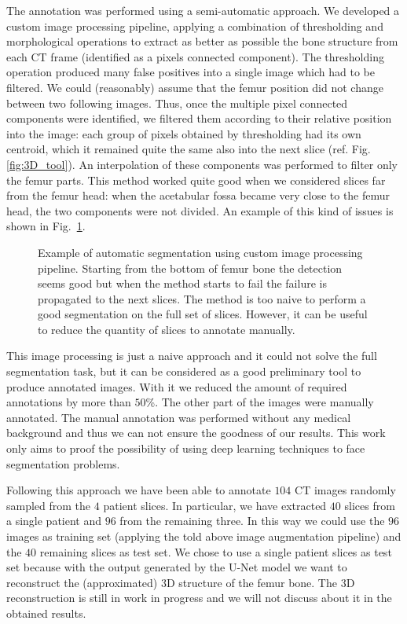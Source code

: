 \documentclass{standalone}
\begin{document}
The annotation was performed using a semi-automatic approach.
We developed a custom image processing pipeline, applying a combination of thresholding and morphological operations to extract as better as possible the bone structure from each CT frame (identified as a pixels connected component).
The thresholding operation produced many false positives into a single image which had to be filtered.
We could (reasonably) assume that the femur position did not change between two following images.
Thus, once the multiple pixel connected components were identified, we filtered them according to their relative position into the image: each group of pixels obtained by thresholding had its own centroid, which it remained quite the same also into the next slice (ref. Fig.\ref{fig:3D_tool}).
An interpolation of these components was performed to filter only the femur parts.
This method worked quite good when we considered slices far from the femur head: when the acetabular fossa became very close to the femur head, the two components were not divided.
An example of this kind of issues is shown in Fig.~\ref{fig:seg_tool}.

\begin{figure}[htbp]
\centering
\def\svgwidth{0.85\textwidth}

\caption{Example of automatic segmentation using custom image processing pipeline.
Starting from the bottom of femur bone the detection seems good but when the method starts to fail the failure is propagated to the next slices.
The method is too naive to perform a good segmentation on the full set of slices.
However, it can be useful to reduce the quantity of slices to annotate manually.
}
\label{fig:seg_tool}
\end{figure}

This image processing is just a naive approach and it could not solve the full segmentation task, but it can be considered as a good preliminary tool to produce annotated images.
With it we reduced the amount of required annotations by more than $50$\%.
The other part of the images were manually annotated.
The manual annotation was performed without any medical background and thus we can not ensure the goodness of our results.
This work only aims to proof the possibility of using deep learning techniques to face segmentation problems.

Following this approach we have been able to annotate $104$ CT images randomly sampled from the $4$ patient slices.
In particular, we have extracted $40$ slices from a single patient and $96$ from the remaining three.
In this way we could use the $96$ images as training set (applying the told above image augmentation pipeline) and the $40$ remaining slices as test set.
We chose to use a single patient slices as test set because with the output generated by the U-Net model we want to reconstruct the (approximated) 3D structure of the femur bone.
The 3D reconstruction is still in work in progress and we will not discuss about it in the obtained results.
\end{document}
